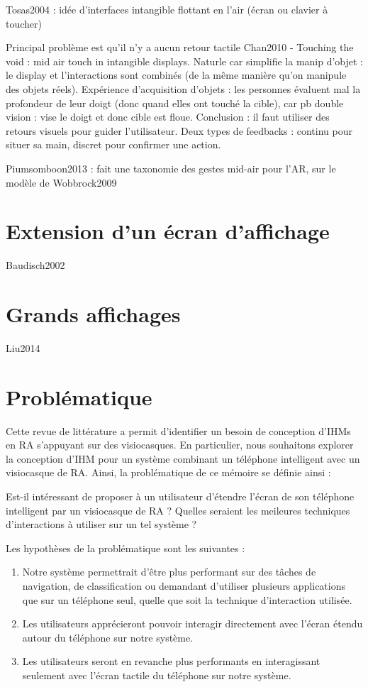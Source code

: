 Tosas2004 : idée d'interfaces intangible flottant en l'air (écran ou clavier à toucher)

Principal problème est qu'il n'y a aucun retour tactile
Chan2010 - Touching the void : mid air touch in intangible displays. Naturle car simplifie la manip d'objet : le display et l'interactions sont combinés (de la même manière qu'on manipule des objets réels). Expérience d'acquisition d'objets : les personnes évaluent mal la profondeur de leur doigt (donc quand elles ont touché la cible), car pb double vision : vise le doigt et donc cible est floue. Conclusion : il faut utiliser des retours visuels pour guider l'utilisateur. Deux types de feedbacks : continu pour situer sa main, discret pour confirmer une action.

Piumsomboon2013 : fait une taxonomie des gestes mid-air pour l'AR, sur le modèle de Wobbrock2009


\section{Extension d'un écran d'affichage}
Baudisch2002


\section{Grands affichages}
Liu2014


\section{Problématique}
Cette revue de littérature a permit d'identifier un besoin de conception d'IHMs en RA s'appuyant sur des visiocasques. En particulier, nous souhaitons explorer la conception d'IHM pour un système combinant un téléphone intelligent avec un visiocasque de RA. Ainsi, la problématique de ce mémoire se définie ainsi :

\begin{displayquote}
  Est-il intéressant de proposer à un utilisateur d'étendre l'écran de son téléphone intelligent par un visiocasque de RA ? Quelles seraient les meileures techniques d'interactions à utiliser sur un tel système ?
\end{displayquote}

Les hypothèses de la problématique sont les suivantes :
\begin{enumerate}
  \item Notre système	permettrait d'être plus performant sur des tâches de navigation, de classification ou demandant d'utiliser plusieurs applications que sur un téléphone seul, quelle que soit la technique d'interaction utilisée.
  \item Les utilisateurs apprécieront pouvoir interagir directement avec l'écran étendu autour du téléphone sur notre système.
  \item Les utilisateurs seront en revanche plus performants en interagissant seulement avec l'écran tactile du téléphone sur notre système.
\end{enumerate}


